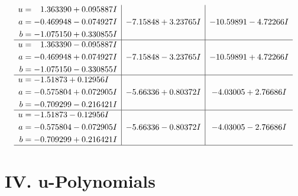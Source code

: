 \documentclass[1p]{elsarticle_modified}
\theoremstyle{definition}
\begin{document}
$$\begin{array}{c|c|c}
\begin{aligned}
u &= \phantom{-}1.363390 + 0.095887 I \\
a &= -0.469948 - 0.074927 I \\
b &= -1.075150 + 0.330855 I\end{aligned}
 & -7.15848 + 3.23765 I & -10.59891 - 4.72266 I \\ \hline\begin{aligned}
u &= \phantom{-}1.363390 - 0.095887 I \\
a &= -0.469948 + 0.074927 I \\
b &= -1.075150 - 0.330855 I\end{aligned}
 & -7.15848 - 3.23765 I & -10.59891 + 4.72266 I \\ \hline\begin{aligned}
u &= -1.51873 + 0.12956 I \\
a &= -0.575804 + 0.072905 I \\
b &= -0.709299 - 0.216421 I\end{aligned}
 & -5.66336 + 0.80372 I & -4.03005 + 2.76686 I \\ \hline\begin{aligned}
u &= -1.51873 - 0.12956 I \\
a &= -0.575804 - 0.072905 I \\
b &= -0.709299 + 0.216421 I\end{aligned}
 & -5.66336 - 0.80372 I & -4.03005 - 2.76686 I\\
 \hline 
 \end{array}$$\newpage
\newpage\renewcommand{\arraystretch}{1}
\centering \section*{ IV. u-Polynomials}
\end{document}
